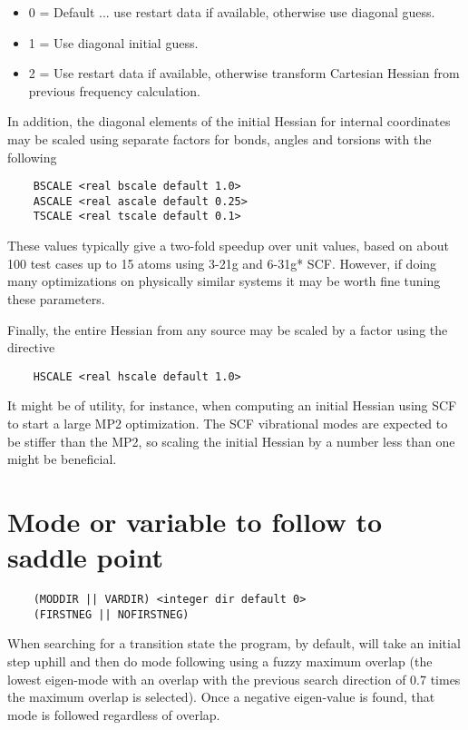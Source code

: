 \begin{itemize}
\item  0 = Default ... use restart data if available, otherwise use diagonal guess.
\item  1 = Use diagonal initial guess.
\item  2 = Use restart data if available, otherwise transform
Cartesian Hessian from previous frequency calculation.
\end{itemize}


In addition, the diagonal elements of the initial Hessian for
internal coordinates may be scaled using separate factors for
bonds, angles and torsions with the following
\begin{verbatim}
    BSCALE <real bscale default 1.0>
    ASCALE <real ascale default 0.25>
    TSCALE <real tscale default 0.1>
\end{verbatim}
These values typically give a two-fold speedup over unit values, based
on about 100 test cases up to 15 atoms using 3-21g and 6-31g* SCF.
However, if doing many optimizations on physically similar systems it
may be worth fine tuning these parameters.

Finally, the entire Hessian from any source may be scaled
by a factor using the directive
\begin{verbatim}
    HSCALE <real hscale default 1.0>
\end{verbatim}
It might be of utility, for instance, when computing an initial
Hessian using SCF to start a large MP2 optimization.  The SCF
vibrational modes are expected to be stiffer than the MP2, so scaling
the initial Hessian by a number less than one might be beneficial.


\section{Mode or variable to follow to saddle point}

\begin{verbatim}
    (MODDIR || VARDIR) <integer dir default 0>
    (FIRSTNEG || NOFIRSTNEG)
\end{verbatim}

When searching for a transition state the program, by default,
will take an initial step uphill and then do mode following
using a fuzzy maximum overlap (the lowest eigen-mode with an
overlap with the previous search direction of 0.7 times the
maximum overlap is selected).  Once a negative eigen-value
is found, that mode is followed regardless of overlap.

